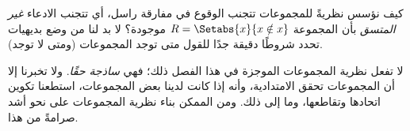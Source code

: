 \documentclass[../../../include/open-logic-section]{subfiles}
\begin{document}
\begin{digress}
كيف نؤسس نظريةً للمجموعات تتجنب الوقوع في مفارقة راسل، أي تتجنب
الادعاء \emph{غير المتسق} بأن المجموعة
$R = \Setabs{x}{x \notin x}$ موجودة؟ لا بد لنا من وضع بديهيات تحدد
شروطًا دقيقة جدًا للقول متى توجد المجموعات (ومتى لا توجد).

لا تفعل نظرية المجموعات الموجزة في هذا الفصل ذلك؛ فهي
\emph{ساذجة حقًا}. %
ولا تخبرنا إلا أن المجموعات تحقق الامتدادية، وأنه
إذا كانت لدينا بعض المجموعات، استطعنا تكوين اتحادها وتقاطعها، وما إلى
ذلك. ومن الممكن بناء نظرية المجموعات على نحو أشد صرامةً من هذا.
\end{digress}
\end{document}
